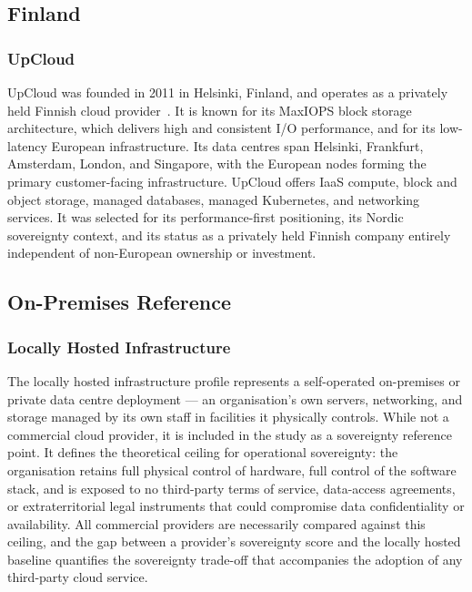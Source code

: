 \subsection{Finland}

\subsubsection{UpCloud}

UpCloud was founded in 2011 in Helsinki, Finland, and operates as a privately held Finnish cloud provider~\cite{UpCloud_About}. It is known for its MaxIOPS block storage architecture, which delivers high and consistent I/O performance, and for its low-latency European infrastructure. Its data centres span Helsinki, Frankfurt, Amsterdam, London, and Singapore, with the European nodes forming the primary customer-facing infrastructure. UpCloud offers IaaS compute, block and object storage, managed databases, managed Kubernetes, and networking services. It was selected for its performance-first positioning, its Nordic sovereignty context, and its status as a privately held Finnish company entirely independent of non-European ownership or investment.

\subsection{On-Premises Reference}

\subsubsection{Locally Hosted Infrastructure}

The locally hosted infrastructure profile represents a self-operated on-premises or private data centre deployment — an organisation's own servers, networking, and storage managed by its own staff in facilities it physically controls. While not a commercial cloud provider, it is included in the study as a sovereignty reference point. It defines the theoretical ceiling for operational sovereignty: the organisation retains full physical control of hardware, full control of the software stack, and is exposed to no third-party terms of service, data-access agreements, or extraterritorial legal instruments that could compromise data confidentiality or availability. All commercial providers are necessarily compared against this ceiling, and the gap between a provider's sovereignty score and the locally hosted baseline quantifies the sovereignty trade-off that accompanies the adoption of any third-party cloud service.

